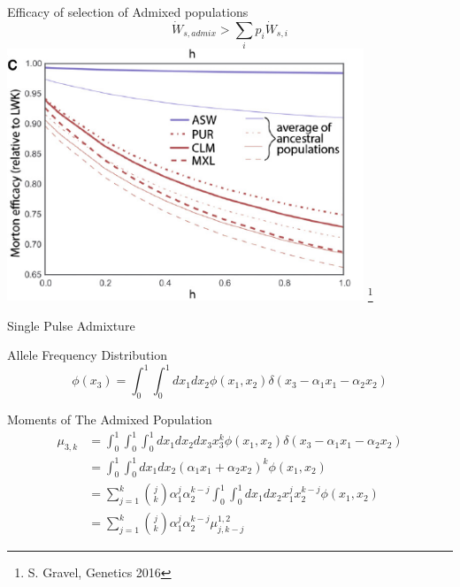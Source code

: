 \documentclass[10pt]{beamer}
\begin{document}
\begin{frame}{\normalsize Efficacy of selection of Admixed populations} 
  \vfill
  \centering
  \[
    \dot W_{s,admix} > \sum_i p_i \dot W_{s,i}
  \]
  \includegraphics[width=0.8\textwidth]{./Figures/Gravel_efsel_admix.png}
  \let\thefootnote\relax\footnote{S. Gravel, Genetics 2016}
\end{frame}

\begin{frame}{Single Pulse Admixture}

\begin{alertblock}{Allele Frequency Distribution}
  \[
    \phi(x_3) = \int_0^1 \int_0^1 dx_1 dx_2 \phi(x_1, x_2) 
    \delta(x_3 - \alpha_1 x_1 - \alpha_2 x_2) 
  \] 
\end{alertblock}

\begin{block}{Moments of The Admixed Population}
  \begin{align}
    \mu_{3,k} &= \int_0^1 \int_0^1\int_0^1dx_1 dx_2 dx_3 x_3^k \phi(x_1, x_2) 
    \delta(x_3 - \alpha_1 x_1 - \alpha_2 x_2)
    \nonumber \\
    &= \int_0^1 \int_0^1dx_1 dx_2 (\alpha_1 x_1 +  \alpha_2 x_2) ^k \phi(x_1, x_2)
    \nonumber \\
    &= \sum_{j=1}^k\binom{j}{k} \alpha_1^j\alpha_2^{k -j} 
    \int_0^1 \int_0^1dx_1 dx_2 x_1^jx_2^{k -j} \phi(x_1, x_2)
    \nonumber \\
    &= \sum_{j=1}^k\binom{j}{k} \alpha_1^j\alpha_2^{k -j} 
    \mu_{j,k-j}^{1,2}
  \end{align}
\end{block}
  
\end{frame}
\end{document}
